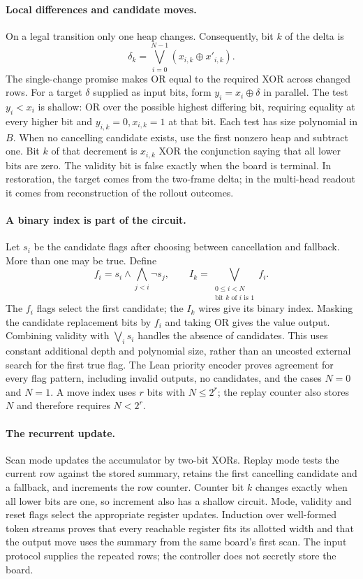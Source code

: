 \documentclass[twoside,11pt]{article}
\numberwithin{theorem}{section}
\numberwithin{equation}{section}
\begin{document}
\paragraph{Local differences and candidate moves.}
On a legal transition only one heap changes. Consequently, bit $k$ of the delta is
\[
\delta_k=\bigvee_{i=0}^{N-1}(x_{i,k}\oplus x'_{i,k}).
\]
The single-change promise makes OR equal to the required XOR across changed rows. For a target $\delta$ supplied as input bits, form $y_i=x_i\oplus\delta$ in parallel. The test $y_i<x_i$ is shallow: OR over the possible highest differing bit, requiring equality at every higher bit and $y_{i,k}=0,x_{i,k}=1$ at that bit. Each test has size polynomial in $B$. When no cancelling candidate exists, use the first nonzero heap and subtract one. Bit $k$ of that decrement is $x_{i,k}$ XOR the conjunction saying that all lower bits are zero. The validity bit is false exactly when the board is terminal. In restoration, the target comes from the two-frame delta; in the multi-head readout it comes from reconstruction of the rollout outcomes.

\paragraph{A binary index is part of the circuit.}
Let $s_i$ be the candidate flags after choosing between cancellation and fallback. More than one may be true. Define
\[
f_i=s_i\wedge\bigwedge_{j<i}\neg s_j,
\qquad
I_k=\bigvee_{\substack{0\le i<N\\\text{bit }k\text{ of }i\text{ is }1}}f_i.
\]
The $f_i$ flags select the first candidate; the $I_k$ wires give its binary index. Masking the candidate replacement bits by $f_i$ and taking OR gives the value output. Combining validity with $\bigvee_i s_i$ handles the absence of candidates. This uses constant additional depth and polynomial size, rather than an uncosted external search for the first true flag. The Lean priority encoder proves agreement for every flag pattern, including invalid outputs, no candidates, and the cases $N=0$ and $N=1$. A move index uses $r$ bits with $N\le2^r$; the replay counter also stores $N$ and therefore requires $N<2^r$.

\paragraph{The recurrent update.}
Scan mode updates the accumulator by two-bit XORs. Replay mode tests the current row against the stored summary, retains the first cancelling candidate and a fallback, and increments the row counter. Counter bit $k$ changes exactly when all lower bits are one, so increment also has a shallow circuit. Mode, validity and reset flags select the appropriate register updates. Induction over well-formed token streams proves that every reachable register fits its allotted width and that the output move uses the summary from the same board's first scan. The input protocol supplies the repeated rows; the controller does not secretly store the board.
\end{document}
